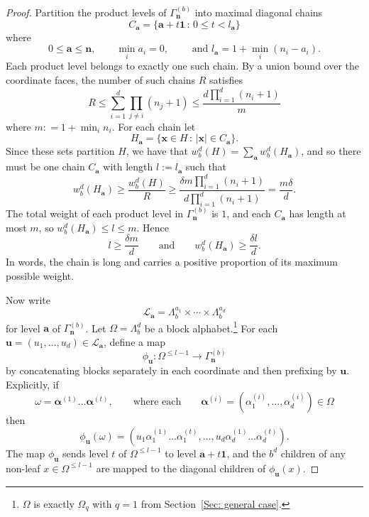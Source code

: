 \documentclass[11pt]{amsart}
\newcommand\labs[1]{\left\lvert#1\right\rvert}
\renewcommand{\leq}{\leqslant}
\renewcommand{\geq}{\geqslant}
\theoremstyle{plain}
\theoremstyle{definition}
\theoremstyle{remark}
\begin{document}
\begin{proof}
Partition the product levels of $\Gamma_{\mathbf{n}}^{(b)}$ into maximal diagonal chains
\[ C_\mathbf{a} = \{ \mathbf{a} + t \mathbf{1} \, : \, 0\leq t <l_{\mathbf{a}}\}\]
where
\[ 0\leq \mathbf{a} \leq \mathbf{n}, \qquad \min_{i} a_i = 0, \qquad \text{ and } l_{\mathbf{a}} = 1+ \min_{i}(n_i-a_i).\]
Each product level belongs to exactly one such chain. By a union bound over the coordinate faces, the number of such chains $R$ satisfies
\[ R \leq \sum_{i=1}^d \prod_{j \neq i} (n_j+1) \leq \frac{d \prod_{i=1}^d (n_i+1)}{m}\]
where $ m: = 1+ \min_{i}n_i$. For each chain let
\[ H_{\mathbf{a}}= \{\mathbf{x} \in H \,: \, \labs{\mathbf{x}} \in C_{\mathbf{a}}\}.\]
Since these sets partition $H$, we have that $w_b^d(H) = \sum_{\mathbf{a}} w_b^d(H_{\mathbf{a}})$, and so there must be one chain $C_{\mathbf{a}}$ with length $l:= l_\mathbf{a}$ such that
\[ w_b^d(H_{\mathbf{a}}) \geq \frac{w_b^d(H)}{R} \geq \frac{\delta m\prod_{i=1}^d (n_i+1)}{d \prod_{i=1}^d(n_i+1)} = \frac{m\delta}{d}.\]
The total weight of each product level in $\Gamma_{\mathbf{n}}^{(b)}$ is $1$, and each $C_{\mathbf{a}}$ has length at most $m$, so $w_b^d(H_{\mathbf{a}}) \leq l \leq m$. Hence
\[ l\geq \frac{\delta m}{d} \qquad \text{and} \qquad w_b^d (H_{\mathbf{a}}) \geq \frac{\delta l}{d}.\]
In words, the chain is long and carries a positive proportion of its maximum possible weight.

Now write
\[ \mathcal{L}_{\mathbf{a}} = \Lambda_b^{a_1} \times \cdots \times \Lambda_b^{a_d}\]
for level $\mathbf{a}$ of $\Gamma_{\mathbf{n}}^{(b)}$. Let $\Omega = \Lambda_b^d$ be a block alphabet.\footnote{$\Omega$ is exactly $\Omega_q$ with $q=1$ from Section~\ref{Sec: general case}.} For each $\mathbf{u} = (u_1,\ldots,u_d) \in \mathcal{L}_{\mathbf{a}}$, define a map
\[\phi_{\mathbf{u}}: \Omega^{\leq l-1} \to \Gamma_{\mathbf{n}}^{(b)}\]
by concatenating blocks separately in each coordinate and then prefixing by $\mathbf{u}$. Explicitly, if
\[ \omega = \bm{\alpha}^{(1)}\ldots \bm{\alpha}^{(t)}, \qquad \text{where each} \qquad \bm{\alpha}^{(i)} = \left(\alpha_1^{(i)},\ldots,\alpha_d^{(i)}\right) \in \Omega\] 
then
\[ \phi_{\mathbf{u}}(\omega) = \left(u_1 \alpha_1^{(1)}\ldots \alpha_1^{(t)},\ldots,u_d \alpha_d^{(1)}\ldots \alpha_d^{(t)}\right).\]
The map $\phi_{\mathbf{u}}$ sends level $t$ of $\Omega^{\leq l-1}$ to level $\mathbf{a} + t \mathbf{1}$, and the $b^d$ children of any non-leaf $x\in \Omega^{\leq l-1}$ are mapped to the diagonal children of $\phi_{\mathbf{u}}(x)$.


\end{proof}
\end{document}
